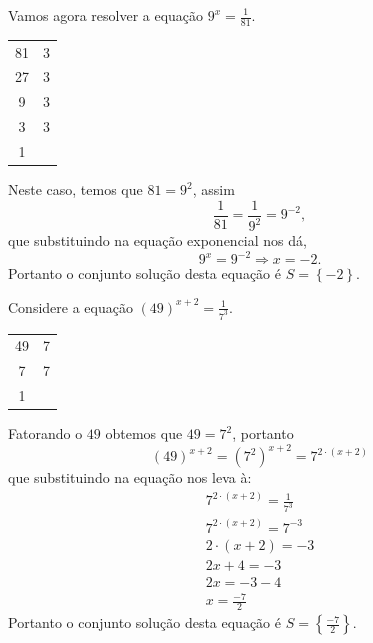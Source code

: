  \begin{exem}
  Vamos agora resolver a equação $9^x= \frac{1}{81}$.

  \begin{tabular}{c|c}
   81 & 3 \\
   27 & 3 \\
   9  & 3 \\
   3  & 3 \\
   1  &   \\
  \end{tabular}

  Neste caso, temos que $81= 9^2$, assim
\begin{equation}
\frac{1}{81}= \frac{1}{9^2}= 9^{-2} ,
\end{equation}
  que substituindo na equação exponencial nos dá,
\begin{equation}
9^x= 9^{-2} \Rightarrow x= -2 .
\end{equation}
  Portanto o conjunto solução desta equação é $S= \left\{ -2 \right\}$.
 \end{exem}

 \begin{exem}
  Considere a equação $(49)^{x+2}= \frac{1}{7^3}$.

  \begin{tabular}{c|c}
   49 & 7 \\
   7  & 7 \\
   1  &   \\
  \end{tabular}

  Fatorando o $49$ obtemos que $49= 7^2$, portanto
\begin{equation}
(49)^{x+2}= (7^2)^{x+2}= 7^{2\cdot (x+2)}
\end{equation}
  que substituindo na equação nos leva à:
  \begin{eqnarray*}
   7^{2\cdot (x+2)}= \frac{1}{7^3} \\
   7^{2\cdot (x+2)}= 7^{-3} \\
   2\cdot (x+2) = -3 \\
   2x + 4 = -3 \\
   2x= -3 -4 \\
   x= \frac{-7}{2}
  \end{eqnarray*}
  Portanto o conjunto solução desta equação é $S= \left\{ \frac{-7}{2} \right\}$.
 \end{exem}
 
